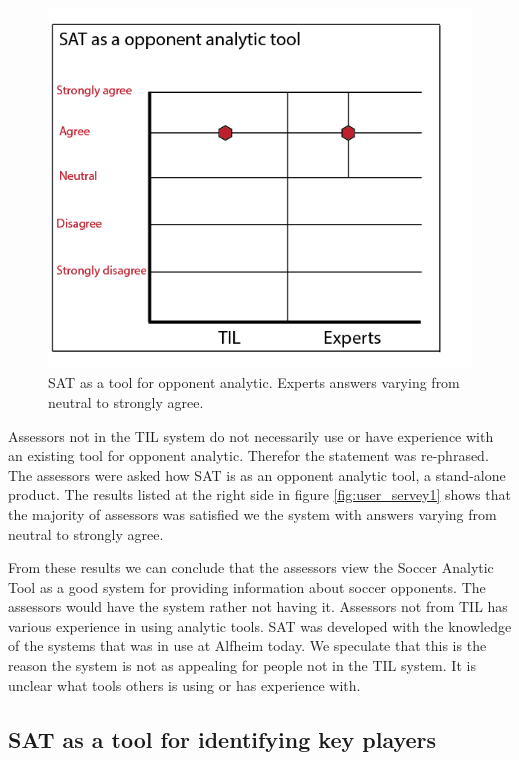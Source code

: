 \begin{figure}[ht!]
\centering
\includegraphics[width=1\textwidth]{images/evaluation/user_servery1}
\caption{SAT as a tool for opponent analytic. Experts answers varying from neutral to strongly agree.}
\label{fig:user_servery1}
\end{figure}

Assessors not in the \ac{TIL} system do not necessarily use or have experience with an existing tool for opponent analytic. Therefor the statement was re-phrased. The assessors were asked how SAT is as an opponent analytic tool, a stand-alone product. The results listed at the right side in figure \ref{fig:user_servey1} shows that the majority of assessors was satisfied we the system with answers varying from neutral to strongly agree.

From these results we can conclude that the assessors view the Soccer Analytic Tool as a good system for providing information about soccer opponents. The assessors would have the system rather not having it. Assessors not from \ac{TIL} has various experience in using analytic tools. SAT was developed with the knowledge of the systems that was in use at Alfheim today. We speculate that this is the reason the system is not as appealing for people not in the \ac{TIL} system. It is unclear what tools others is using or has experience with.

\subsection{SAT as a tool for identifying key players}

